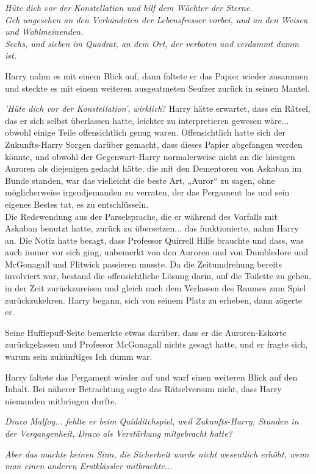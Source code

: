 {\emph{Hüte dich vor der Konstellation und hilf dem Wächter der Sterne.}\\ \emph{Geh ungesehen an den Verbündeten der Lebensfresser vorbei, und an den Weisen und Wohlmeinenden.\\ Sechs, und sieben im Quadrat, an dem Ort, der verboten und verdammt dumm ist.}

Harry nahm es mit einem Blick auf, dann faltete er das Papier wieder zusammen und steckte es mit einem weiteren ausgeatmeten Seufzer zurück in seinen Mantel.

\emph{'Hüte dich vor der Konstellation'}, \emph{wirklich}? Harry hätte erwartet, dass ein Rätsel, das er sich selbst überlassen hatte, leichter zu interpretieren gewesen wäre... obwohl einige Teile offensichtlich genug waren. Offensichtlich hatte sich der Zukunfts-Harry Sorgen darüber gemacht, dass dieses Papier abgefangen werden könnte, und obwohl der Gegenwart-Harry normalerweise nicht an die hiesigen Auroren als diejenigen gedacht hätte, die mit den Dementoren von Askaban im Bunde standen, war das vielleicht die beste Art, „Auror“ zu sagen, ohne möglicherweise irgendjemanden zu verraten, der das Pergament las und sein eigenes Bestes tat, es zu entschlüsseln.\\ Die Redewendung aus der Parselsprache, die er während des Vorfalls mit Askaban benutzt hatte, zurück zu übersetzen... das funktionierte, nahm Harry an. Die Notiz hatte besagt, dass Professor Quirrell Hilfe brauchte und dass, was auch immer vor sich ging, unbemerkt von den Auroren und von Dumbledore und McGonagall und Flitwick passieren musste. Da die Zeitumdrehung bereits involviert war, bestand die offensichtliche Lösung darin, auf die Toilette zu gehen, in der Zeit zurückzureisen und gleich nach dem Verlassen des Raumes zum Spiel zurückzukehren. Harry begann, sich von seinem Platz zu erheben, dann zögerte er.

Seine Hufflepuff-Seite bemerkte etwas darüber, dass er die Auroren-Eskorte zurückgelassen und Professor McGonagall nichts gesagt hatte, und er fragte sich, warum sein zukünftiges Ich dumm war.

Harry faltete das Pergament wieder auf und warf einen weiteren Blick auf den Inhalt. Bei näherer Betrachtung sagte das Rätselversum nicht, dass Harry niemanden mitbringen durfte.

\emph{Draco Malfoy}..\emph{. fehlte er beim Quidditchspiel, weil Zukunfts-Harry, Stunden in der Vergangenheit, Draco als Verstärkung mitgebracht hatte?}

\emph{Aber das machte keinen Sinn, die Sicherheit wurde nicht wesentlich erhöht, wenn man einen anderen Erstklässler mitbrachte...}

}
